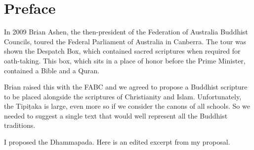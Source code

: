 \documentclass[12pt,openany]{book}%
\begin{document}
%
\chapter*{Preface}

In 2009 Brian Ashen, the then-president of the Federation of Australia Buddhist Councils, toured the Federal Parliament of Australia in Canberra. The tour was shown the Despatch Box, which contained sacred scriptures when required for oath-taking. This box, which sits in a place of honor before the Prime Minister, contained a Bible and a Quran.

Brian raised this with the FABC and we agreed to propose a Buddhist scripture to be placed alongside the scriptures of Christianity and Islam. Unfortunately, the \textsanskrit{Tipiṭaka} is large, even more so if we consider the canons of all schools. So we needed to suggest a single text that would well represent all the Buddhist traditions.

I proposed the Dhammapada. Here is an edited excerpt from my proposal.
\end{document}
